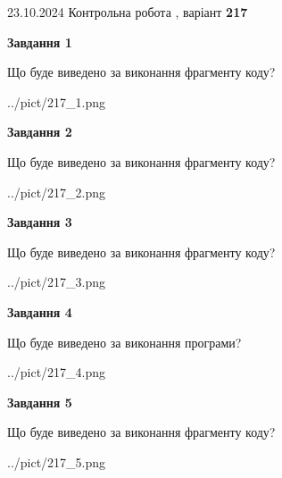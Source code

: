 \documentclass[12pt, ukrainian]{article}
\begin{document}
{\Large{23.10.2024 Контрольна робота , варіант  \No \textbf { 217 }\par}}
{
\begin {large}
{\begin {center}\textbf{Завдання 1}\end {center}}

Що буде виведено за виконання фрагменту коду?\par
\begin{center}
	{../pict/217_1.png}
\end{center}
\newpage

{\begin {center}\textbf{Завдання 2}\end {center}}

Що буде виведено за виконання фрагменту коду?\par
\begin{center}
	{../pict/217_2.png}
\end{center}
\newpage

{\begin {center}\textbf{Завдання 3}\end {center}}

Що буде виведено за виконання фрагменту коду?\par
\begin{center}
	{../pict/217_3.png}
\end{center}
\newpage

{\begin {center}\textbf{Завдання 4}\end {center}}

Що буде виведено за виконання програми?\par
\begin{center}
	{../pict/217_4.png}
\end{center}
\newpage

{\begin {center}\textbf{Завдання 5}\end {center}}

Що буде виведено за виконання фрагменту коду?\par
\begin{center}
	{../pict/217_5.png}
\end{center}
\newpage


\end{large}}
\end{document}

